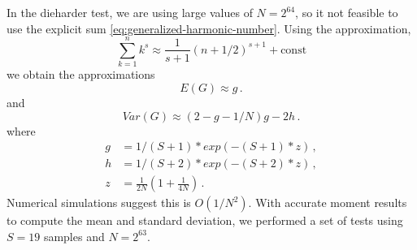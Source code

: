 In the dieharder test, we are using large values of $N=2^{64}$, so it not feasible to use the explicit sum \ref{eq:generalized-harmonic-number}.  Using the approximation,
\begin{equation}
\sum_{k=1}^{n} k^s \approx \frac{1}{s+1} (n+1/2)^{s+1} + \text{const}
\end{equation}
we obtain the approximations
\begin{equation}
E(G) \approx g \,.
\end{equation}
and
\begin{equation}
Var(G) \approx (2-g-1/N)g -2h \,.
\end{equation}
where
\begin{align}
g &= 1/(S+1)*exp(-(S+1)*z) \,, \\
h &= 1/(S+2)*exp(-(S+2)*z) \,, \\
z &= \frac{1}{2N} \left(1+\frac{1}{4N}\right) \,.
\end{align}
Numerical simulations suggest this is $O(1/N^2)$.  With accurate moment results to compute the mean and standard deviation, we performed a set of tests using $S=19$ samples and $N=2^{63}$.

